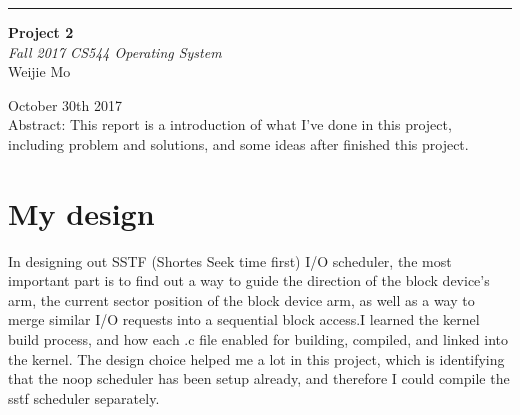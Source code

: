 \documentclass[10pt,draftclsnofoot,peerreview,letterpaper,onecolumn,]{IEEEtran}
\begin{document}
\begin{titlepage} %
	
	\raggedleft %
	
	\rule{1pt}{\textheight} %
	\hspace{0.05\textwidth} %
	\parbox[b]{0.75\textwidth}{ %
		
		{\Huge\bfseries Project 2 }\\[2\baselineskip] %
		{\large\textit{Fall 2017 CS544 Operating System}}\\[4\baselineskip] %
		{\Large Weijie Mo} %
		
		\vspace{0.5\textheight} %
		
		{\noindent October 30th 2017}\\[\baselineskip] %
        {\noindent Abstract:
    This report is a introduction of what I've done in this project, including problem and solutions, and some ideas after finished this project.}\\[\baselineskip] %
	}

\end{titlepage}

\section{My design}

In designing out SSTF (Shortes Seek time first) I/O scheduler, the most important part is to find out a way to guide the direction of the block device's arm, the current sector position of the block device arm, as well as a way to merge similar I/O requests into a sequential block access.I learned the kernel build process, and how each .c file enabled for building, compiled, and linked into the kernel. The design choice helped me a lot in this project, which is identifying that the noop scheduler has been setup already, and therefore I could compile the sstf scheduler separately.
\
\end{document}
